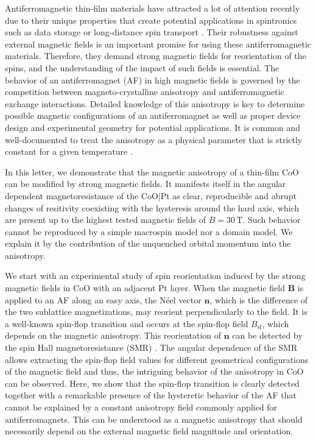\documentclass[%
 aps,
prl,
superscriptaddress,
 amsmath,amssymb,
reprint,%
]{revtex4-2}
\begin{document}
\maketitle

Antiferromagnetic thin-film materials have attracted a lot of attention recently due to their unique properties that create potential applications in spintronics such as data storage \cite{Wadley2016Science, Jungwirth2016NN} or long-distance spin transport \cite{Lebrun2018Nature, Han2020NN}. Their robustness against external magnetic fields is an important promise for using these antiferromagnetic materials. Therefore, they demand strong magnetic fields for reorientation of the spins, and the understanding of the impact of such fields is essential. The behavior of an antiferromagnet (AF) in high magnetic fields is governed by the competition between magneto-crystalline anisotropy and antiferromagnetic exchange interactions. Detailed knowledge of this anisotropy is key to determine possible magnetic configurations of an antiferromagnet as well as proper device design and experimental geometry for potential applications. It is common and well-documented to treat the anisotropy as a physical parameter that is strictly constant for a given temperature \cite{Hoogeboom2017APL, Baldrati2018PRB, Geprags2020JAP}.

In this letter, we demonstrate that the magnetic anisotropy of a thin-film CoO can be modified by strong magnetic fields. It manifests itself in the angular dependent magnetoresistance of the CoO$|$Pt as clear, reproducible and abrupt changes of resitivity coexisting with the hysteresis around the hard axis, which are present up to the highest tested magnetic fields of $B=30\,\text{T}$. Such behavior cannot be reproduced by a simple macrospin model nor a domain model. We explain it by the contribution of the unquenched orbital momentum into the anisotropy.

We start with an experimental study of spin reorientation induced by the strong magnetic fields in CoO with an adjacent Pt layer. When the magnetic field $\mathbf{B}$ is applied to an AF along an easy axis, the N\'eel vector $\mathbf{n}$, which is the difference of the two sublattice magnetizations, may reorient perpendicularly to the field. It is a well-known spin-flop transition and occurs at the spin-flop field $B_\text{sf}$, which depends on the magnetic anisotropy. This reorientation of $\mathbf{n}$ can be detected by the spin Hall magnetoresistance (SMR) \cite{Fischer2018PRB, Geprags2020JAP, Baldrati2018PRB, Hoogeboom2017APL, Baldrati2020PRL}. The angular dependence of the SMR allows extracting the spin-flop field values for different geometrical configurations of the magnetic field and thus, the intriguing behavior of the anisotropy in CoO can be observed. Here, we show that the spin-flop transition is clearly detected together with a remarkable presence of the hysteretic behavior of the AF that cannot be explained by a constant anisotropy field commonly applied for antiferromagnets. This can be understood as a magnetic anisotropy that should necessarily depend on the external magnetic field magnitude and orientation.
\end{document}
